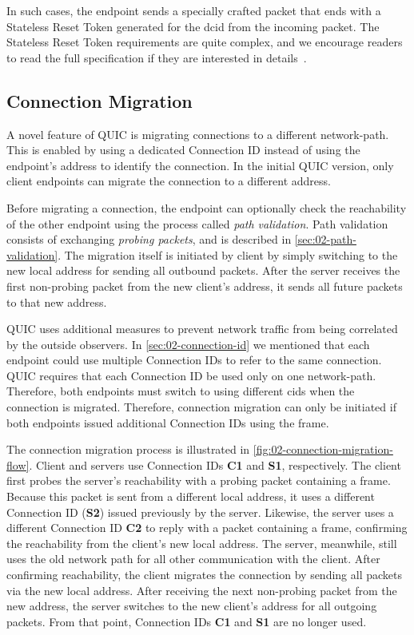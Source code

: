 In such cases, the endpoint sends a specially crafted packet that ends with a Stateless Reset Token
generated for the \gls{dcid} from the incoming packet. The Stateless Reset Token requirements are
quite complex, and we encourage readers to read the full specification if they are interested in
details~\autocite[Section~10.4]{draft-ietf-quic-transport}.

\subsection{Connection Migration}

A novel feature of QUIC is migrating connections to a different \gls{network-path}. This is enabled
by using a dedicated Connection ID instead of using the endpoint's address to identify the
connection. In the initial QUIC version, only client endpoints can migrate the connection to a
different address.

Before migrating a connection, the endpoint can optionally check the reachability of the other
endpoint using the process called \textit{path validation}. Path validation consists of exchanging
\textit{probing packets}, and is described in \autoref{sec:02-path-validation}. The migration itself
is initiated by client by simply switching to the new local address for sending all outbound
packets. After the server receives the first non-probing packet from the new client's address, it
sends all future packets to that new address.

QUIC uses additional measures to prevent network traffic from being correlated by the outside
observers. In \autoref{sec:02-connection-id} we mentioned that each endpoint could use multiple
Connection IDs to refer to the same connection. QUIC requires that each Connection ID be used only
on one \gls{network-path}. Therefore, both endpoints must switch to using different \glspl{cid} when
the connection is migrated. Therefore, connection migration can only be initiated if both endpoints
issued additional Connection IDs using the \NEWCONNECTIONID{} frame.

The connection migration process is illustrated in \autoref{fig:02-connection-migration-flow}.
Client and servers use Connection IDs \textbf{C1} and \textbf{S1}, respectively. The client first
probes the server's reachability with a probing packet containing a \PATHCHALLENGE{} frame. Because
this packet is sent from a different local address, it uses a different Connection ID (\textbf{S2})
issued previously by the server. Likewise, the server uses a different Connection ID \textbf{C2} to
reply with a packet containing a \PATHRESPONSE{} frame, confirming the reachability from the
client's new local address. The server, meanwhile, still uses the old network path for all other
communication with the client. After confirming reachability, the client migrates the connection by
sending all packets via the new local address. After receiving the next non-probing packet from the
new address, the server switches to the new client's address for all outgoing packets. From that
point, Connection IDs \textbf{C1} and \textbf{S1} are no longer used.

